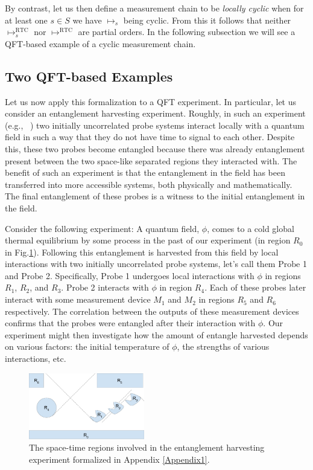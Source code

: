 \documentclass[12pt,prd,superscriptaddress,floatfix,amsmath,amssymb,amsfonts,nofootinbib]{revtex4-2}
\begin{document}
By contrast, let us then define a measurement chain to be \textit{locally cyclic} when for at least one $s\in S$ we have $\mapsto_s$ being cyclic. From this it follows that neither $\mapsto^\text{RTC}_s$ nor $\mapsto^\text{RTC}$ are partial orders. In the following subsection we will see a QFT-based example of a cyclic measurement chain.

\subsection{Two QFT-based Examples}\label{Appendix1.3}
Let us now apply this formalization to a QFT experiment. In particular, let us consider an entanglement harvesting experiment. Roughly, in such an experiment (e.g., ~\cite{Valentini1991, Reznik2003, Pozas-Kerstjens:2015,Menicucci, Terno2016, Cosmo, Henderson2018,Ruep2021}) two initially uncorrelated probe systems interact locally with a quantum field in such a way that they do not have time to signal to each other. Despite this, these two probes become entangled because there was already entanglement present between the two space-like separated regions they interacted with. The benefit of such an experiment is that the entanglement in the field has been transferred into more accessible systems, both physically and mathematically. The final entanglement of these probes is a witness to the initial entanglement in the field.

Consider the following experiment: A quantum field, $\phi$, comes to a cold global thermal equilibrium by some process in the past of our experiment (in region $R_0$ in Fig.\ref{FigEntHarv}). Following this entanglement is harvested from this field by local interactions with two initially uncorrelated probe systems, let's call them $\text{Probe}$ 1 and $\text{Probe}$ 2. Specifically, $\text{Probe}$ 1 undergoes local interactions with $\phi$ in regions $R_1$, $R_2$, and $R_3$. $\text{Probe}$ 2 interacts with $\phi$ in region $R_4$. Each of these probes later interact with some measurement device $M_1$ and $M_2$ in regions $R_5$ and $R_6$ respectively. The correlation between the outputs of these measurement devices confirms that the probes were entangled after their interaction with $\phi$. Our experiment might then investigate how the amount of entangle harvested depends on various factors: the initial temperature of $\phi$, the strengths of various interactions, etc. 

\begin{figure}
\includegraphics[width=0.45\textwidth]{Figures/EntHarvDiagram.pdf}
\caption{The space-time regions involved in the entanglement harvesting experiment formalized in Appendix \ref{Appendix1}.}\label{FigEntHarv}
\end{figure}
\end{document}
